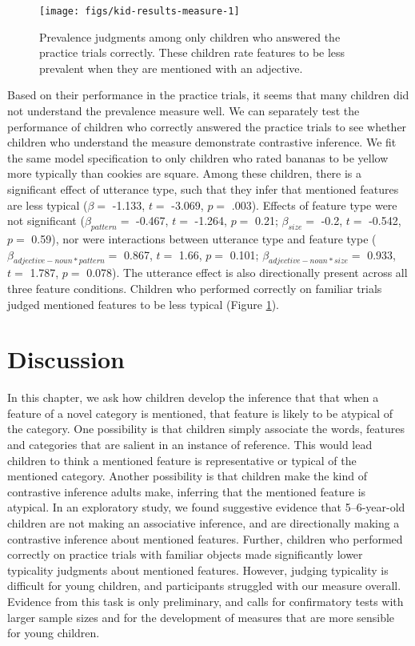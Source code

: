 \documentclass{ucetd}
\begin{document}
\begin{figure}[!tb]

{\centering \texttt{[image: figs/kid-results-measure-1]} 

}

\caption{Prevalence judgments among only children who answered the practice trials correctly. These children rate features to be less prevalent when they are mentioned with an adjective.}\label{fig:kid-results-measure}
\end{figure}

Based on their performance in the practice trials, it seems that many
children did not understand the prevalence measure well. We can
separately test the performance of children who correctly answered the
practice trials to see whether children who understand the measure
demonstrate contrastive inference. We fit the same model specification
to only children who rated bananas to be yellow more typically than
cookies are square. Among these children, there is a significant effect
of utterance type, such that they infer that mentioned features are less
typical (\(\beta =\) -1.133, \(t =\) -3.069, \(p =\) .003). Effects of
feature type were not significant (\(\beta_{pattern} =\) -0.467, \(t =\)
-1.264, \(p =\) 0.21; \(\beta_{size} =\) -0.2, \(t =\) -0.542, \(p =\)
0.59), nor were interactions between utterance type and feature type
(\(\beta_{adjective-noun*pattern} =\) 0.867, \(t =\) 1.66, \(p =\)
0.101; \(\beta_{adjective-noun*size} =\) 0.933, \(t =\) 1.787, \(p =\)
0.078). The utterance effect is also directionally present across all
three feature conditions. Children who performed correctly on familiar
trials judged mentioned features to be less typical (Figure
\ref{fig:kid-results-measure}).

\hypertarget{discussion-3}{%
\section{Discussion}\label{discussion-3}}

In this chapter, we ask how children develop the inference that that
when a feature of a novel category is mentioned, that feature is likely
to be atypical of the category. One possibility is that children simply
associate the words, features and categories that are salient in an
instance of reference. This would lead children to think a mentioned
feature is representative or typical of the mentioned category. Another
possibility is that children make the kind of contrastive inference
adults make, inferring that the mentioned feature is atypical. In an
exploratory study, we found suggestive evidence that 5--6-year-old
children are not making an associative inference, and are directionally
making a contrastive inference about mentioned features. Further,
children who performed correctly on practice trials with familiar
objects made significantly lower typicality judgments about mentioned
features. However, judging typicality is difficult for young children,
and participants struggled with our measure overall. Evidence from this
task is only preliminary, and calls for confirmatory tests with larger
sample sizes and for the development of measures that are more sensible
for young children.
\end{document}
